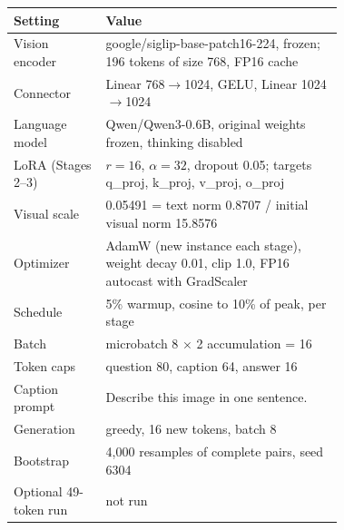\begin{tabular}{lp{0.72\linewidth}}
\toprule
Setting & Value \\
\midrule
Vision encoder & google/siglip-base-patch16-224, frozen; 196 tokens of size 768, FP16 cache \\
Connector & Linear 768$\to$1024, GELU, Linear 1024$\to$1024 \\
Language model & Qwen/Qwen3-0.6B, original weights frozen, thinking disabled \\
LoRA (Stages 2--3) & $r=16$, $\alpha=32$, dropout 0.05; targets q\_proj, k\_proj, v\_proj, o\_proj \\
Visual scale & 0.05491 = text norm 0.8707 / initial visual norm 15.8576 \\
Optimizer & AdamW (new instance each stage), weight decay 0.01, clip 1.0, FP16 autocast with GradScaler \\
Schedule & 5\% warmup, cosine to 10\% of peak, per stage \\
Batch & microbatch 8 $\times$ 2 accumulation = 16 \\
Token caps & question 80, caption 64, answer 16 \\
Caption prompt & Describe this image in one sentence. \\
Generation & greedy, 16 new tokens, batch 8 \\
Bootstrap & 4,000 resamples of complete pairs, seed 6304 \\
Optional 49-token run & not run \\
\bottomrule
\end{tabular}